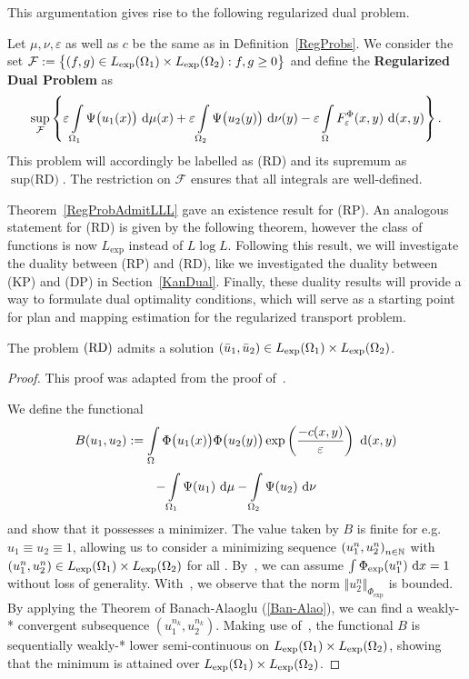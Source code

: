 This argumentation gives rise to the following regularized dual problem.

\begin{definition}\label{RegDualProb}
	Let $\mu, \nu, \varepsilon$ as well as $c$ be the same as in Definition~\ref{RegProbs}. We consider the set $\mathcal{F} := \big\{ (f, g) \in \Lexp[\Omega_1] \times \Lexp[\Omega_2] : f, g \ge 0 \big\}$ and define the \textbf{Regularized Dual Problem} as
	\[ \sup\limits_{\mathcal{F}} \left\{ \varepsilon \int\limits_{\Omega_1} \Psi\big( u_1(x) \big)~\Dx{\mu} + \varepsilon \int\limits_{\Omega_2} \Psi\big( u_2(y) \big)~\Dx[y]{\nu} - \varepsilon \int\limits_{\Omega} F_{\varepsilon}^{\Phi}(x, y)~\Dx[x, y]{} \right\}. \]
	This problem will accordingly be labelled as (RD) and its supremum as $\sup \text{(RD)}$. The restriction on $\mathcal{F}$ ensures that all integrals are well-defined.
\end{definition}

Theorem~\ref{RegProbAdmitLLL} gave an existence result for (RP). An analogous statement for (RD) is given by the following theorem, however the class of functions is now $L_{\exp}$ instead of $L \log L$. Following this result, we will investigate the duality between (RP) and (RD), like we investigated the duality between (KP) and (DP) in Section~\ref{KanDual}. Finally, these duality results will provide a way to formulate dual optimality conditions, which will serve as a starting point for plan and mapping estimation for the regularized transport problem.

\begin{theorem}\label{RegDualAdmit}
	The problem$\text{\normalfont\ (RD)}$ admits a solution $(\bar{u}_1, \bar{u}_2) \in \Lexp[\Omega_1] \times \Lexp[\Omega_2]$.
\end{theorem}

\begin{proof}
	This proof was adapted from the proof of\ \cite[Theorem~4.6]{Cla2021}.
	
	We define the functional
	\[ B(u_1, u_2) := \int\limits_{\Omega} \Phi\big( u_1(x) \big) \Phi\big( u_2(y) \big) \exp\left( \frac{-c(x, y)}{\varepsilon} \right)~\D[(x, y)] \]
	\[ - \int\limits_{\Omega_1} \Psi(u_1)~\D - \int\limits_{\Omega_2} \Psi(u_2)~\D[\nu] \]
	and show that it possesses a minimizer. The value taken by $B$ is finite for e.g.\ $u_1 \equiv u_2 \equiv 1$, allowing us to consider a minimizing sequence ${(u_1^n, u_2^n)}_{\NinN}$ with $(u_1^n, u_2^n) \in \Lexp[\Omega_1] \times \Lexp[\Omega_2]$ for all \NinN. By\ \cite[Lemma~4.2]{Cla2021}, we can assume $\int \Phi_{\exp}(u_1^n)~\D[x] = 1$ without loss of generality. With\ \cite[Lemma~4.4]{Cla2021}, we observe that the norm $\Vert u_2^n \Vert_{\Phi_{\exp}}$ is bounded. By applying the Theorem of Banach-Alaoglu (\ref{Ban-Alao}), we can find a weakly-* convergent subsequence $(u_1^{n_k}, u_2^{n_k})$. Making use of\ \cite[Lemma~4.5]{Cla2021}, the functional $B$ is sequentially weakly-* lower semi-continuous on $\Lexp[\Omega_1] \times \Lexp[\Omega_2]$, showing that the minimum is attained over $\Lexp[\Omega_1] \times \Lexp[\Omega_2]$.
\end{proof}

